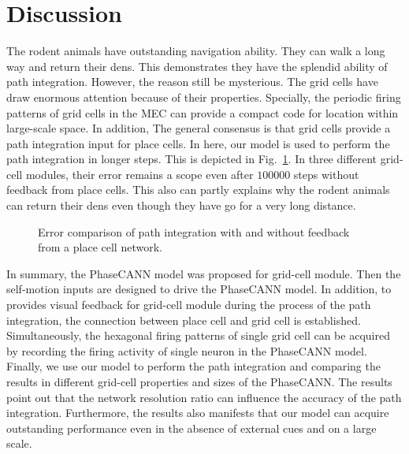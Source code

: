 \documentclass[preprint,12pt]{elsarticle}
\begin{document}
\section{Discussion}
The rodent animals have outstanding navigation ability\cite{Ball2013}. They can walk a long way and return their dens. This demonstrates they have the splendid ability of path integration. However, the reason still be mysterious. The grid cells have draw enormous attention because of their properties. Specially, the periodic firing patterns of grid cells in the MEC can provide a compact  code for location within large-scale space\cite{Bush2015}. In addition, The general consensus is that grid cells provide a path integration input for place cells\cite{McNaughton2006}. In here, our model is used to perform the path integration in longer steps. This is depicted in Fig.~\ref{fig:path_integration_long}. In three different grid-cell modules, their error remains a scope even after $100000$ steps without feedback from place cells. This also can partly explains why the rodent animals can return their dens even though they have go for a very long distance. 
\begin{figure}[!t]
	\centering
	\caption{Error comparison of path integration with and without feedback from a place cell network.  }
	\label{fig:path_integration_long}
\end{figure}

In summary, the PhaseCANN model was proposed for grid-cell module. Then the self-motion inputs are designed to drive the PhaseCANN model. In addition, to provides visual feedback for grid-cell module during the process of the path integration, the connection between place cell and grid cell is established. Simultaneously, the hexagonal firing patterns of single grid cell can be acquired by recording the firing activity of single neuron in the PhaseCANN model. Finally, we use our model to perform the path integration and comparing the results in different grid-cell properties and sizes of the PhaseCANN. The results point out that the network resolution ratio can influence the accuracy of the path integration. Furthermore, the results also manifests that our model can acquire outstanding performance even in the absence of external cues and on a large scale.
\end{document}

